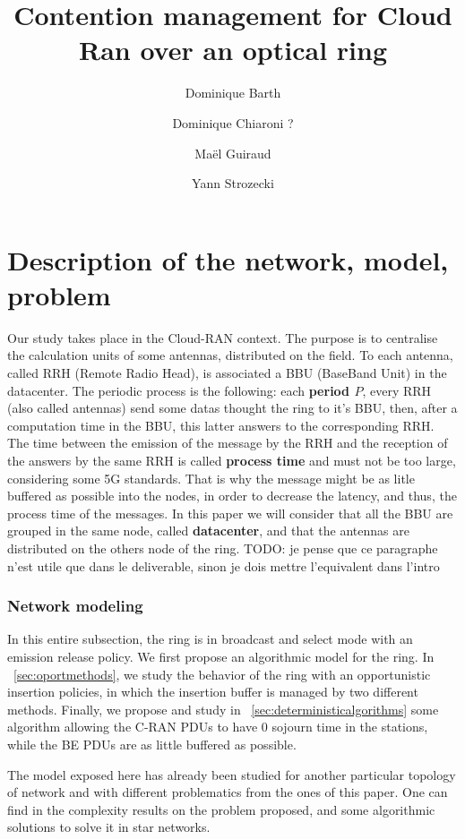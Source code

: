 \documentclass[a4paper,10pt,english]{article}
\title{Contention management for Cloud Ran over an optical ring}
\author[1]{Dominique Barth}
\author[2]{Dominique Chiaroni ?}
\author[1]{Ma\"el Guiraud}
\author[1]{Yann Strozecki}
\affil[1]{David Laboratory, UVSQ}
\affil[2]{Nokia Bell Labs France}
\newcommand{\todo}[1]{{\color{red} TODO: {#1}}}
\begin{document}
\maketitle


\section{Description of the network, model, problem}

    Our study takes place in the Cloud-RAN context. The purpose is to centralise the calculation units of some antennas, distributed on the field. To each antenna, called RRH (Remote Radio Head), is associated a BBU (BaseBand Unit) in the datacenter.
      The periodic process is the following: each {\bf period $P$}, every RRH (also called antennas) send some datas thought the ring to it's BBU, then, after a computation time in the BBU, this latter answers to the corresponding RRH. 
      The time between the emission of the message by the RRH and the reception of the answers by the same RRH is called {\bf process time} and must not be too large, considering some 5G standards. That is why the message might be as litle buffered as possible into the nodes, in order to decrease the latency, and thus, the process time of the messages.
      In this paper we will consider that all the BBU are grouped in the same node, called {\bf datacenter}, and that the antennas are distributed on the others node of the ring.
      \todo{je pense que ce paragraphe n'est utile que dans le deliverable, sinon je dois mettre l'equivalent dans l'intro}
  
   
  \subsubsection{Network modeling}
  
   In this entire subsection, the ring is in broadcast and select mode with an emission release policy. We first propose an algorithmic model for the ring. In ~\ref{sec:oportmethods}, we study the behavior of the ring with an opportunistic insertion policies, in which the insertion buffer is managed by two different methods. Finally, we propose and study in ~\ref{sec:deterministicalgorithms} some algorithm allowing the C-RAN PDUs to have $0$ sojourn time in the stations, while the BE PDUs are as little buffered as possible.

The model exposed here has already been studied for another particular topology of network and with different problematics from the ones of this paper. One can find in \cite{latency2017} the complexity results on the problem proposed, and some algorithmic solutions to solve it in star networks.
\end{document}
